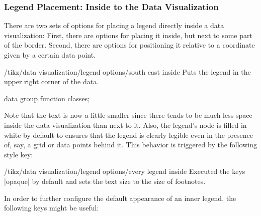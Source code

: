 \subsubsection{Legend Placement: Inside to the Data Visualization}
\label{section-dv-legend-inside}

There are two sets of options for placing a legend directly inside a data
visualization: First, there are options for placing it inside, but next to some
part of the border. Second, there are options for positioning it relative to a
coordinate given by a certain data point.

\begin{key}{/tikz/data visualization/legend options/south east inside}
    Puts the legend in the upper right corner of the data.
\begin{codeexample}[
    width=8cm,
    preamble={\usetikzlibrary{datavisualization.formats.functions}},
    pre={\tikz \datavisualization data group {function classes} = {
  data [set=log, format=function] {
    var x : interval [0.2:2.5];
    func y = ln(\value x);
  }
  data [set=lin, format=function] {
    var x : interval [-2:2.5];
    func y = 0.5*\value x;
  }
  data [set=squared, format=function] {
    var x : interval [-1.5:1.5];
    func y = \value x*\value x;
  }
  data [set=exp, format=function] {
    var x : interval [-2.5:1];
    func y = exp(\value x);
  }
};},
]
\tikz \datavisualization [
  scientific axes,
  visualize as smooth line/.list=
    {log, lin},
  legend=south east inside,
  log=    {label in legend={text=$\log x$}},
  lin=    {label in legend={text=$x/2$}},
  style sheet=strong colors]
data group {function classes};
\end{codeexample}

    Note that the text is now a little smaller since there tends to be much
    less space inside the data visualization than next to it. Also, the
    legend's node is filled in white by default to ensures that the legend is
    clearly legible even in the presence of, say, a grid or data points behind
    it. This behavior is triggered by the following style key:

    \begin{stylekey}{/tikz/data visualization/legend options/every legend inside}
        Executed the keys |opaque| by default and sets the  text size to the
        size of footnotes.
    \end{stylekey}
\end{key}

In order to further configure the default appearance of an inner legend, the
following keys might be useful:

